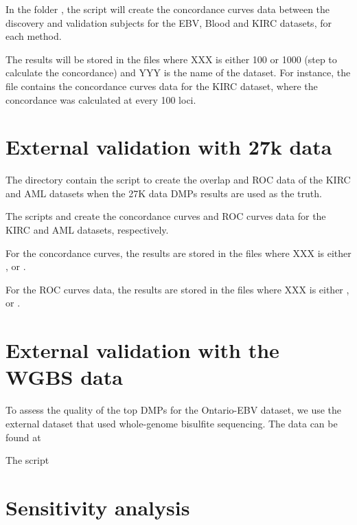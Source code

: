 \documentclass[12pt]{article}
\begin{document}
In the folder , the script  will create the concordance curves data between the discovery and validation subjects for the EBV, Blood and KIRC datasets, for each method. 

The results will be stored in the files  where XXX is either 100 or 1000 (step to calculate the concordance) and YYY is the name of the dataset. For instance, the file  contains the concordance curves data for the KIRC dataset, where the concordance was calculated at every 100 loci. 

\section{External validation with 27k data}

The directory  contain the script to create the overlap and ROC data of the KIRC and AML datasets when the 27K data DMPs results are used as the truth. 

The scripts  and  create the concordance curves and ROC curves data for the KIRC and AML datasets, respectively.

For the concordance curves, the results are stored in the files  where XXX is either ,  or . 

For the ROC curves data, the results are stored in the files  where XXX is either ,  or . 

\section{External validation with the WGBS data}

To assess the quality of the top DMPs for the Ontario-EBV dataset, we use the external dataset  that used whole-genome bisulfite sequencing. The data can be found at  

The script  

\section{Sensitivity analysis}
\end{document}
